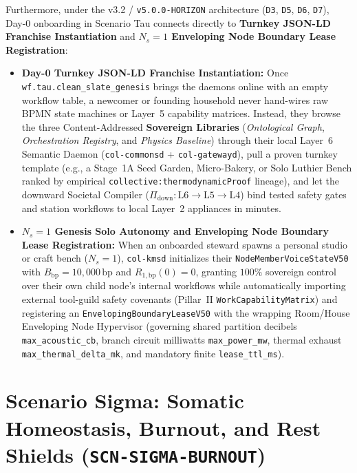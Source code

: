 Furthermore, under the v3.2 / \texttt{v5.0.0-HORIZON} architecture (\texttt{D3}, \texttt{D5}, \texttt{D6}, \texttt{D7}),
Day-0 onboarding in Scenario Tau connects directly to \textbf{Turnkey JSON-LD Franchise Instantiation} and
\textbf{$N_s=1$ Enveloping Node Boundary Lease Registration}:
\begin{itemize}
    \item \textbf{Day-0 Turnkey JSON-LD Franchise Instantiation:} Once \texttt{wf.tau.clean\_slate\_genesis} brings the
    daemons online with an empty workflow table, a newcomer or founding household never hand-wires raw BPMN state
    machines or Layer~5 capability matrices. Instead, they browse the three Content-Addressed \textbf{Sovereign
    Libraries} (\emph{Ontological Graph}, \emph{Orchestration Registry}, and \emph{Physics Baseline}) through their
    local Layer~6 Semantic Daemon (\texttt{col-commonsd} + \texttt{col-gatewayd}), pull a proven turnkey template
    (e.g., a Stage~1A Seed Garden, Micro-Bakery, or Solo Luthier Bench ranked by empirical
    \texttt{collective:thermodynamicProof} lineage), and let the downward Societal Compiler ($\Pi_{\mathrm{down}} :
    \mathrm{L6} \to \mathrm{L5} \to \mathrm{L4}$) bind tested safety gates and station workflows to local Layer~2
    appliances in minutes.
    \item \textbf{$N_s=1$ Genesis Solo Autonomy and Enveloping Node Boundary Lease Registration:} When an onboarded
    steward spawns a personal studio or craft bench ($N_s = 1$), \texttt{col-kmsd} initializes their
    \texttt{NodeMemberVoiceStateV50} with $B_{\mathrm{bp}} = 10{,}000\,\mathrm{bp}$ and $R_{1,\mathrm{bp}}(0) = 0$,
    granting $100\%$ sovereign control over their own child node's internal workflows while automatically importing
    external tool-guild safety covenants (Pillar~II \texttt{WorkCapabilityMatrix}) and registering an
    \texttt{EnvelopingBoundaryLeaseV50} with the wrapping Room/House Enveloping Node Hypervisor (governing shared
    partition decibels \texttt{max\_acoustic\_cb}, branch circuit milliwatts \texttt{max\_power\_mw}, thermal exhaust
    \texttt{max\_thermal\_delta\_mk}, and mandatory finite \texttt{lease\_ttl\_ms}).
\end{itemize}

\section{Scenario Sigma: Somatic Homeostasis, Burnout, and Rest Shields (\texttt{SCN-SIGMA-BURNOUT})}
\label{sec:wave-a-sigma}

